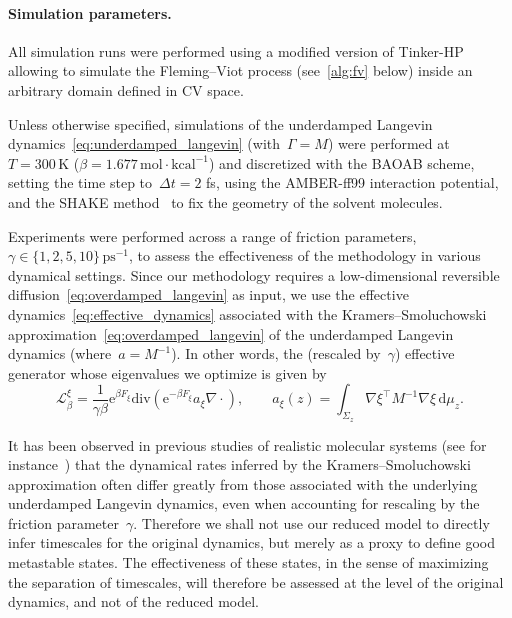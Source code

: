 \documentclass[a4]{article}
\newcommand{\cL}{\mathcal{L}}
\renewcommand{\d}{\mathrm{d}}
\newcommand{\e}{\mathrm{e}}
\renewcommand{\div}{\mathrm{div}}
\newcommand{\1}{\mathbbm 1}
\begin{document}
\paragraph{Simulation parameters.}
All simulation runs were performed using a modified version of Tinker-HP~\cite{Tinker18} allowing to simulate the Fleming--Viot process (see~\ref{alg:fv} below) inside an arbitrary domain defined in CV space.

Unless otherwise specified, simulations of the underdamped Langevin dynamics~\eqref{eq:underdamped_langevin} (with~$\Gamma=M$) were performed at~$T=300\,\mathrm{K}$ ($\beta=1.677\,\mathrm{mol}\cdot\mathrm{kcal}^{-1}$) and discretized with the BAOAB scheme, setting the time step to~$\Delta t = 2$ fs, using the AMBER-ff99 interaction potential, and the SHAKE method~\cite{RCB77} to fix the geometry of the solvent molecules.

Experiments were performed across a range of friction parameters,~$\gamma\in\{1,2,5,10\}\,\mathrm{ps}^{-1}$, to assess the effectiveness of the methodology in various dynamical settings.
Since our methodology requires a low-dimensional reversible diffusion~\eqref{eq:overdamped_langevin} as input, we use the effective dynamics~\eqref{eq:effective_dynamics} associated with the Kramers--Smoluchowski approximation~\eqref{eq:overdamped_langevin} of the underdamped Langevin dynamics (where~$a=M^{-1}$). In other words, the (rescaled by~$\gamma$) effective generator whose eigenvalues we optimize is given by
\begin{equation}
    \label{eq:eff_generator_num}
    \cL_\beta^\xi=\frac1{\gamma\beta}\e^{\beta F_\xi}\div\left(\e^{-\beta F_\xi}a_\xi\nabla\cdot\right),\qquad a_{\xi}(z) = \int_{\Sigma_z}\nabla\xi^\top M^{-1}\nabla\xi\,\d\mu_z.
\end{equation}

It has been observed in previous studies of realistic molecular systems (see for instance~\cite[Sections 4.2.2 and 4.3.2]{NN24}) that the dynamical rates inferred by the Kramers--Smoluchowski approximation often differ greatly from those associated with the underlying underdamped Langevin dynamics, even when accounting for rescaling by the friction parameter~$\gamma$. Therefore we shall not use our reduced model to directly infer timescales for the original dynamics, but merely as a proxy to define good metastable states.
The effectiveness of these states, in the sense of maximizing the separation of timescales, will therefore be assessed at the level of the original dynamics, and not of the reduced model.
\end{document}
